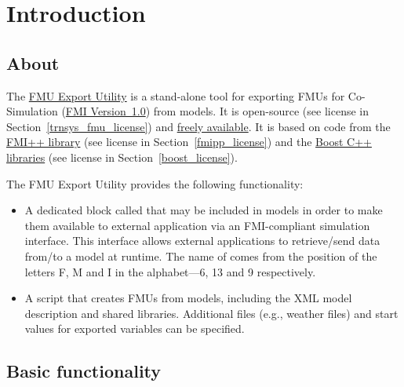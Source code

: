 \chapter{Introduction}


\section{About}

The \href{http://trnsys-fmu.sourceforge.net}{\fmipp \trnsys FMU Export Utility} is a stand-alone tool for exporting FMUs for Co-Simulation (\href{https://www.fmi-standard.org/}{FMI Version~1.0}) from \href{http://www.trnsys.com/}{\trnsys} models. It is open-source (see license in Section~\ref{trnsys_fmu_license}) and \href{http://trnsys-fmu.sourceforge.net}{freely available}. It is based on code from the \href{http://fmipp.sourceforge.net}{FMI++ library} (see license in Section~\ref{fmipp_license}) and the \href{http://www.boost.org/}{Boost C++ libraries} (see license in Section~\ref{boost_license}).

The \fmipp \trnsys FMU Export Utility provides the following functionality:
\begin{itemize}
  \item A dedicated \trnsys block called \type that may be included in \trnsys models in order to make them available to external application via an FMI-compliant simulation interface. This interface allows external applications to retrieve/send data from/to a \trnsys model at runtime. The name of \type comes from the position of the letters F, M and I in the alphabet---6, 13 and 9 respectively.
  \item A \href{https://www.python.org/}{\python} script that creates FMUs from \trnsys models, including the XML model description and shared libraries. Additional files (e.g., weather files) and start values for exported variables can be specified.
\end{itemize}

\section{Basic functionality}

